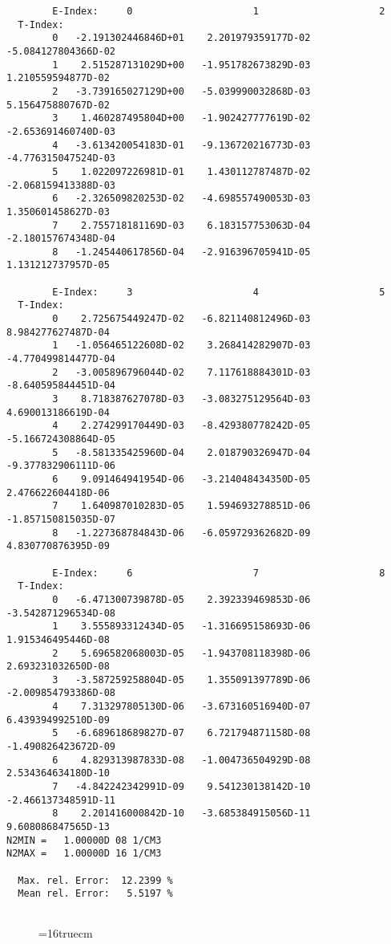 \documentclass[12pt,dvipdfmx]{article}
\begin{document}
\begin{small}\begin{verbatim}
        E-Index:     0                     1                     2
  T-Index:
        0   -2.191302446846D+01    2.201979359177D-02   -5.084127804366D-02
        1    2.515287131029D+00   -1.951782673829D-03    1.210559594877D-02
        2   -3.739165027129D+00   -5.039990032868D-03    5.156475880767D-02
        3    1.460287495804D+00   -1.902427777619D-02   -2.653691460740D-03
        4   -3.613420054183D-01   -9.136720216773D-03   -4.776315047524D-03
        5    1.022097226981D-01    1.430112787487D-02   -2.068159413388D-03
        6   -2.326509820253D-02   -4.698557490053D-03    1.350601458627D-03
        7    2.755718181169D-03    6.183157753063D-04   -2.180157674348D-04
        8   -1.245440617856D-04   -2.916396705941D-05    1.131212737957D-05

        E-Index:     3                     4                     5
  T-Index:
        0    2.725675449247D-02   -6.821140812496D-03    8.984277627487D-04
        1   -1.056465122608D-02    3.268414282907D-03   -4.770499814477D-04
        2   -3.005896796044D-02    7.117618884301D-03   -8.640595844451D-04
        3    8.718387627078D-03   -3.083275129564D-03    4.690013186619D-04
        4    2.274299170449D-03   -8.429380778242D-05   -5.166724308864D-05
        5   -8.581335425960D-04    2.018790326947D-04   -9.377832906111D-06
        6    9.091464941954D-06   -3.214048434350D-05    2.476622604418D-06
        7    1.640987010283D-05    1.594693278851D-06   -1.857150815035D-07
        8   -1.227368784843D-06   -6.059729362682D-09    4.830770876395D-09

        E-Index:     6                     7                     8
  T-Index:
        0   -6.471300739878D-05    2.392339469853D-06   -3.542871296534D-08
        1    3.555893312434D-05   -1.316695158693D-06    1.915346495446D-08
        2    5.696582068003D-05   -1.943708118398D-06    2.693231032650D-08
        3   -3.587259258804D-05    1.355091397789D-06   -2.009854793386D-08
        4    7.313297805130D-06   -3.673160516940D-07    6.439394992510D-09
        5   -6.689618689827D-07    6.721794871158D-08   -1.490826423672D-09
        6    4.829313987833D-08   -1.004736504929D-08    2.534364634180D-10
        7   -4.842242342991D-09    9.541230138142D-10   -2.466137348591D-11
        8    2.201416000842D-10   -3.685384915056D-11    9.608086847565D-13
N2MIN =   1.00000D 08 1/CM3
N2MAX =   1.00000D 16 1/CM3

  Max. rel. Error:  12.2399 %
  Mean rel. Error:   5.5197 %


\end{verbatim}\end{small}
\begin{figure} \label{2.2.5mar}
\epsfxsize=16truecm
\end{figure}
\newpage
\end{document}

